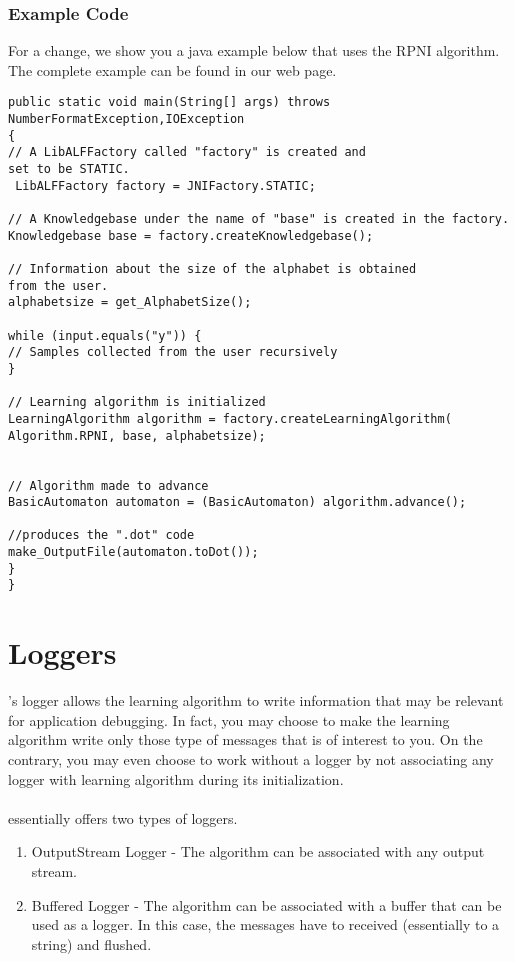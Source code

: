 \paragraph{}

\subsubsection*{Example Code}
For a change, we show you a java example below that uses the RPNI \offline algorithm. The complete example can be found in our web page.
\lstset{language=java, numbers=left, numberstyle=\tiny, stepnumber=1, numbersep=5pt}
\begin{lstlisting}[frame=single]
public static void main(String[] args) throws 
NumberFormatException,IOException 
{
// A LibALFFactory called "factory" is created and 
set to be STATIC.
 LibALFFactory factory = JNIFactory.STATIC;

// A Knowledgebase under the name of "base" is created in the factory.
Knowledgebase base = factory.createKnowledgebase();

// Information about the size of the alphabet is obtained 
from the user.
alphabetsize = get_AlphabetSize();

while (input.equals("y")) {
// Samples collected from the user recursively
}

// Learning algorithm is initialized 
LearningAlgorithm algorithm = factory.createLearningAlgorithm(
Algorithm.RPNI, base, alphabetsize);


// Algorithm made to advance
BasicAutomaton automaton = (BasicAutomaton) algorithm.advance();

//produces the ".dot" code
make_OutputFile(automaton.toDot());
}
}
\end{lstlisting}




\section{Loggers}
\libalf's logger allows the learning algorithm to write information that may be relevant for application debugging. In fact, you may choose to make the learning algorithm write only those type of messages that is of interest to you. On the contrary, you may even choose to work without a logger by not associating any logger with learning algorithm during its initialization. 
\paragraph{}
\libalf essentially offers two types of loggers. 
\begin{enumerate}
 \item OutputStream Logger - The algorithm can be associated with any output stream.
 \item Buffered Logger - The algorithm can be associated with a buffer that can be used as a logger. In this case, the messages have to received (essentially to a string) and flushed.
\end{enumerate}
